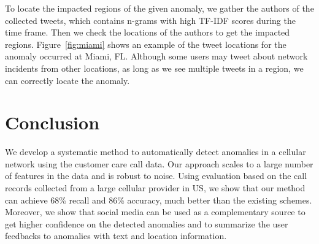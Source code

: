 To locate the impacted regions of the given anomaly,
we gather the authors of the collected tweets, which contains n-grams with high TF-IDF scores 
during the time frame.
Then we check the locations of the authors to get the impacted regions.
Figure~\ref{fig:miami} shows an example of the tweet locations for the anomaly occurred at Miami, 
FL. Although some users may tweet about network incidents from other locations,
as long as we see multiple tweets in a region, we can correctly locate the anomaly.  


\section{Conclusion}
\label{sec:conclusion}

We develop a systematic method to automatically detect anomalies in a
cellular network using the customer care call data. Our approach scales to a
large number of features in the data and is robust to 
noise. Using evaluation based on the call records collected from a
large cellular provider in US, we show that our method can
achieve 68\% recall and 86\% accuracy, much better than the existing
schemes.
Moreover, we show that social media can be used as a complementary source
to get higher confidence on the detected anomalies and to
summarize the user feedbacks to anomalies with text and location information.

